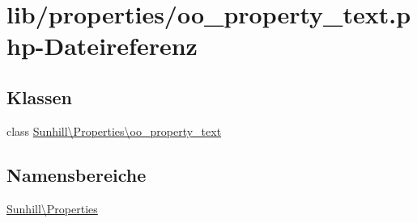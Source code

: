 \hypertarget{oo__property__text_8php}{}\section{lib/properties/oo\+\_\+property\+\_\+text.php-\/\+Dateireferenz}
\label{oo__property__text_8php}
\subsection*{Klassen}
\begin{DoxyCompactItemize}
\item 
class \hyperlink{classSunhill_1_1Properties_1_1oo__property__text}{Sunhill\textbackslash{}\+Properties\textbackslash{}oo\+\_\+property\+\_\+text}
\end{DoxyCompactItemize}
\subsection*{Namensbereiche}
\begin{DoxyCompactItemize}
\item 
 \hyperlink{namespaceSunhill_1_1Properties}{Sunhill\textbackslash{}\+Properties}
\end{DoxyCompactItemize}
